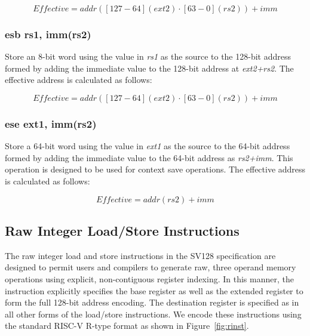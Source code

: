 \documentclass{article}
\begin{document}
\begin{equation}
Effective = addr([127-64](ext2) \cdot [63-0](rs2))+imm
\end{equation}

\subsubsection{esb rs1, imm(rs2)}
Store an 8-bit word using the value in \textit{rs1} as the source 
to the 128-bit address formed by adding the immediate value to the 
128-bit address at \textit{ext2+rs2}.  The effective address is calculated 
as follows: 

\begin{equation}
Effective = addr([127-64](ext2) \cdot [63-0](rs2))+imm
\end{equation}

\subsubsection{ese ext1, imm(rs2)}
Store a 64-bit word using the value in \textit{ext1} as the source to the 
64-bit address formed by adding the immediate value to the 64-bit 
address as \textit{rs2+imm}.  This operation is designed to be used for 
context save operations.  The effective address is calculated as follows: 

\begin{equation}
Effective = addr(rs2)+imm
\end{equation}

\subsection{Raw Integer Load/Store Instructions}
\label{sec:RawIntegerLoadStoreInstructions}

The raw integer load and store instructions in the SV128 specification 
are designed to permit users and compilers to generate raw, three operand 
memory operations using explicit, non-contiguous register indexing.  In this manner, 
the instruction explicitly specifies the base register as well as the extended register 
to form the full 128-bit address encoding.  The destination register is specified as 
in all other forms of the load/store instructions.  We encode these instructions 
using the standard RISC-V R-type format as shown in Figure~\ref{fig:rinst}.  
\end{document}
